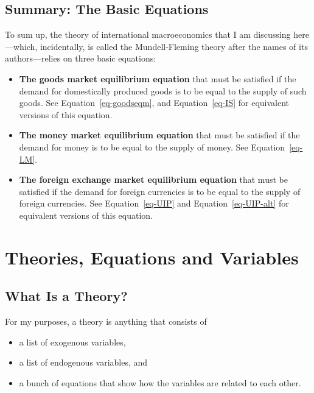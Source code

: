 \documentclass[
  letterpaper,
]{book}
\providecommand{\tightlist}{%
  \setlength{\itemsep}{0pt}\setlength{\parskip}{0pt}}\usepackage{longtable,booktabs,array}
\theoremstyle{plain}
\theoremstyle{remark}
\begin{document}
\section{Summary: The Basic Equations}\label{sec-summary-basiceq}

To sum up, the theory of international macroeconomics that I am
discussing here---which, incidentally, is called the Mundell-Fleming
theory after the names of its authors---relies on three basic equations:

\begin{itemize}
\tightlist
\item
  \textbf{The goods market equilibrium equation} that must be satisfied
  if the demand for domestically produced goods is to be equal to the
  supply of such goods. See Equation~\ref{eq-goodseqm}, and
  Equation~\ref{eq-IS} for equivalent versions of this equation.
\item
  \textbf{The money market equilibrium equation} that must be satisfied
  if the demand for money is to be equal to the supply of money. See
  Equation~\ref{eq-LM}.
\item
  \textbf{The foreign exchange market equilibrium equation} that must be
  satisfied if the demand for foreign currencies is to be equal to the
  supply of foreign currencies. See Equation~\ref{eq-UIP} and
  Equation~\ref{eq-UIP-alt} for equivalent versions of this equation.
\end{itemize}


\chapter{Theories, Equations and Variables}\label{sec-theqvar}

\section{What Is a Theory?}\label{sec-theory}

For my purposes, a theory is anything that consists of

\begin{itemize}
\tightlist
\item
  a list of exogenous variables,
\item
  a list of endogenous variables, and
\item
  a bunch of equations that show how the variables are related to each
  other.
\end{itemize}
\end{document}
